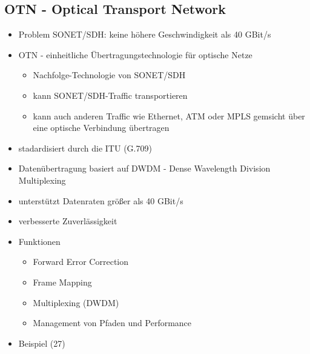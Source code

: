 \subsection{OTN - Optical Transport Network}
\begin{itemize}
	\item Problem SONET/SDH: keine höhere Geschwindigkeit als 40 GBit/s
	\item OTN - einheitliche Übertragungstechnologie für optische Netze
	\begin{itemize}
		\item Nachfolge-Technologie von SONET/SDH
		\item kann SONET/SDH-Traffic transportieren
		\item kann auch anderen Traffic wie Ethernet, ATM oder MPLS gemsicht über eine optische Verbindung übertragen
	\end{itemize}
	\item stadardisiert durch die ITU (G.709)
	\item Datenübertragung basiert auf DWDM - Dense Wavelength Division Multiplexing
	\item unterstützt Datenraten größer als 40 GBit/s
	\item verbesserte Zuverlässigkeit
	\item Funktionen
	\begin{itemize}
		\item Forward Error Correction
		\item Frame Mapping
		\item Multiplexing (DWDM)
		\item Management von Pfaden und Performance
	\end{itemize}
	\item Beispiel (27)
\end{itemize}
